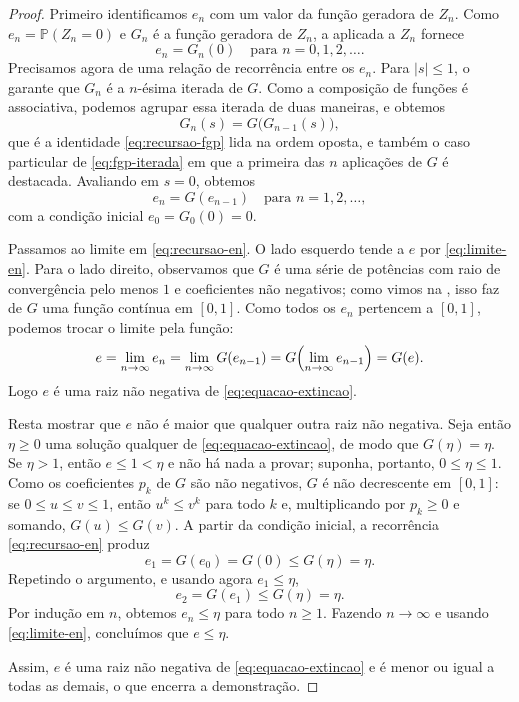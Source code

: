 \documentclass[12pt,portuguese]{article}
\theoremstyle{definition}
\theoremstyle{plainexercise}
\theoremstyle{starredexercise}
\theoremstyle{definition}
\begin{document}
\begin{proof}
Primeiro identificamos $e_n$ com um valor da função geradora de $Z_n$.
Como $e_n=\mathbb{P}(Z_n=0)$ e $G_n$ é a função geradora de $Z_n$, a
 aplicada a $Z_n$ fornece
\[
e_n=G_n(0)
\quad\text{para } n=0,1,2,\ldots.
\]
Precisamos agora de uma relação de recorrência entre os $e_n$. Para
$|s|\leqslant 1$, o  garante que $G_n$ é a
$n$-ésima iterada de $G$. Como a composição de funções é associativa,
podemos agrupar essa iterada de duas maneiras, e obtemos
\[
G_n(s)=G\bigl(G_{n-1}(s)\bigr),
\]
que é a identidade \eqref{eq:recursao-fgp} lida na ordem oposta, e também
o caso particular de \eqref{eq:fgp-iterada} em que a primeira das $n$
aplicações de $G$ é destacada. Avaliando em $s=0$, obtemos
\begin{equation}\label{eq:recursao-en}
e_n=G(e_{n-1})
\quad\text{para } n=1,2,\ldots,
\end{equation}
com a condição inicial $e_0=G_0(0)=0$.

Passamos ao limite em \eqref{eq:recursao-en}. O lado esquerdo tende a $e$
por \eqref{eq:limite-en}. Para o lado direito, observamos que $G$ é uma
série de potências com raio de convergência pelo menos $1$ e coeficientes
não negativos; como vimos na , isso faz de $G$
uma função contínua em $[0,1]$. Como todos os $e_n$ pertencem a $[0,1]$,
podemos trocar o limite pela função:
\[
e=\lim_{n\to\infty}e_n
=\lim_{n\to\infty}G(e_{n-1})
=G\Bigl(\lim_{n\to\infty}e_{n-1}\Bigr)
=G(e).
\]
Logo $e$ é uma raiz não negativa de \eqref{eq:equacao-extincao}.

Resta mostrar que $e$ não é maior que qualquer outra raiz não negativa.
Seja então $\eta\geqslant 0$ uma solução qualquer de \eqref{eq:equacao-extincao},
de modo que $G(\eta)=\eta$. Se $\eta>1$, então $e\leqslant 1<\eta$ e não há
nada a provar; suponha, portanto, $0\leqslant\eta\leqslant 1$. Como os
coeficientes $p_k$ de $G$ são não negativos, $G$ é não decrescente em
$[0,1]$: se $0\leqslant u\leqslant v\leqslant 1$,
então $u^k\leqslant v^k$ para todo $k$ e, multiplicando por $p_k\geqslant 0$
e somando, $G(u)\leqslant G(v)$. A partir da condição inicial, a
recorrência \eqref{eq:recursao-en} produz
\[
e_1=G(e_0)=G(0)\leqslant G(\eta)=\eta.
\]
Repetindo o argumento, e usando agora $e_1\leqslant\eta$,
\[
e_2=G(e_1)\leqslant G(\eta)=\eta.
\]
Por indução em $n$, obtemos $e_n\leqslant\eta$ para todo $n\geqslant 1$.
Fazendo $n\to\infty$ e usando \eqref{eq:limite-en}, concluímos que
$e\leqslant\eta$.

Assim, $e$ é uma raiz não negativa de \eqref{eq:equacao-extincao} e é menor
ou igual a todas as demais, o que encerra a demonstração.
\end{proof}
\end{document}
